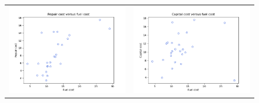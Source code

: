 \begin{enumerate}[label= (\alph*)]
\begin{figure}[H]
\begin{tabular}{cc}
        \end{tabular}
    \end{figure}

    \begin{figure}[H]
        \centering
        \begin{tabular}{cc}
            \includegraphics[scale=0.30]{./python/chapter-5/Question-5-22-a-xy-FuelRepair.png} &
            \includegraphics[scale=0.30]{./python/chapter-5/Question-5-22-a-xy-FuelCapital.png} \\

\end{tabular}
\end{figure}
\end{enumerate}
